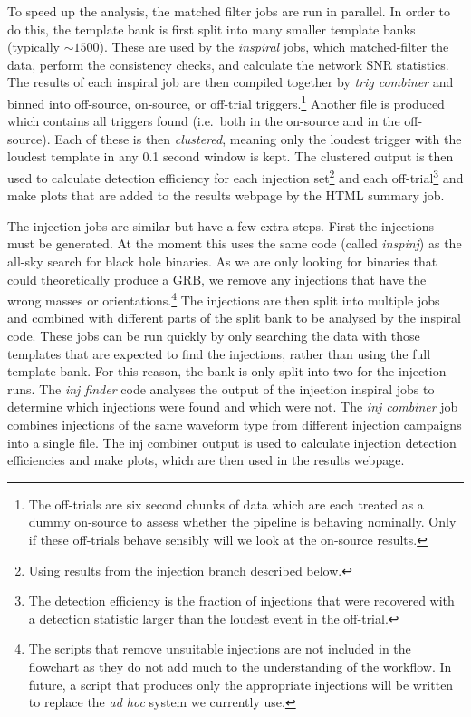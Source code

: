 \documentclass[11pt]{cuthesis}
\begin{document}
To speed up the analysis, the matched filter jobs are run in parallel. In order to do this, the template bank is first split into many smaller template banks (typically $\sim1500$). These are used by the \textit{inspiral} jobs, which matched-filter the data, perform the consistency checks, and calculate the network SNR statistics. The results of each inspiral job are then compiled together by \textit{trig combiner} and binned into off-source, on-source, or off-trial triggers.\footnote{The off-trials are six second chunks of data which are each treated as a dummy on-source to assess whether the pipeline is behaving nominally. Only if these off-trials behave sensibly will we look at the on-source results.} Another file is produced which contains all triggers found (i.e.~both in the on-source and in the off-source). Each of these is then \textit{clustered}, meaning only the loudest trigger with the loudest template in any 0.1 second window is kept. The clustered output is then used to calculate detection efficiency for each injection set\footnote{Using results from the injection branch described below.} and each off-trial\footnote{The detection efficiency is the fraction of injections that were recovered with a detection statistic larger than the loudest event in the off-trial.} and make plots that are added to the results webpage by the HTML summary job. 

The injection jobs are similar but have a few extra steps. First the injections must be generated. At the moment this uses the same code (called \textit{inspinj}) as the all-sky search for black hole binaries. As we are only looking for binaries that could theoretically produce a GRB, we remove any injections that have the wrong masses or orientations.\footnote{The scripts that remove unsuitable injections are not included in the flowchart as they do not add much to the understanding of the workflow. In future, a script that produces only the appropriate injections will be written to replace the \textit{ad hoc} system we currently use.} The injections are then split into multiple jobs and combined with different parts of the split bank to be analysed by the inspiral code. These jobs can be run quickly by only searching the data with those templates that are expected to find the injections, rather than using the full template bank. For this reason, the bank is only split into two for the injection runs. The \textit{inj finder} code analyses the output of the injection inspiral jobs to determine which injections were found and which were not. The \textit{inj combiner} job combines injections of the same waveform type from different injection campaigns into a single file. The inj combiner output is used to calculate injection detection efficiencies and make plots, which are then used in the results webpage. 
\end{document}
